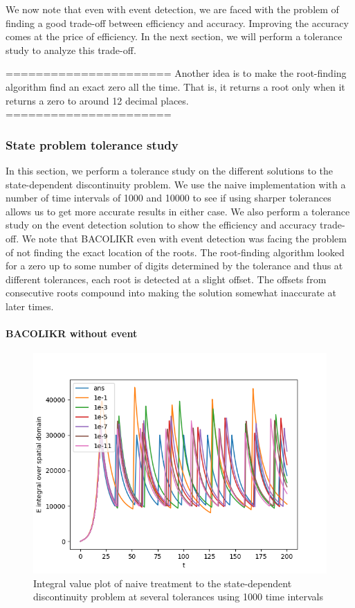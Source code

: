 \documentclass{article}
\begin{document}
We now note that even with event detection, we are faced with the problem of finding a good trade-off between efficiency and accuracy. Improving the accuracy comes at the price of efficiency. In the next section, we will perform a tolerance study to analyze this trade-off.

======================
Another idea is to make the root-finding algorithm find an exact zero all the time. That is, it returns a root only when it returns a zero to around 12 decimal places.
======================

\subsubsection{State problem tolerance study}
\label{subsubsection:pde_state_tol_study}
In this section, we perform a tolerance study on the different solutions to the state-dependent discontinuity problem. We use the naive implementation with a number of time intervals of 1000 and 10000 to see if using sharper tolerances allows us to get more accurate results in either case. We also perform a tolerance study on the event detection solution to show the efficiency and accuracy trade-off. We note that BACOLIKR even with event detection was facing the problem of not finding the exact location of the roots. The root-finding algorithm looked for a zero up to some number of digits determined by the tolerance and thus at different tolerances, each root is detected at a slight offset. The offsets from consecutive roots compound into making the solution somewhat inaccurate at later times. 

\paragraph{BACOLIKR without event}
\begin{figure}[H]
\centering
\includegraphics[width=0.7\linewidth]{./figures/pde_state_disc_tol_bacolikr_naive_1000}
\caption{Integral value plot of naive treatment to the state-dependent discontinuity problem at several tolerances using 1000 time intervals}
\label{fig:pde_state_disc_tol_bacolikr_naive_1000}
\end{figure}
\end{document}
